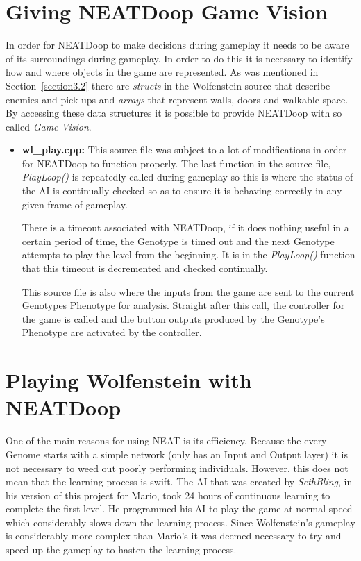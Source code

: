 \documentclass[]{Learning-to-Play-Wolfenstein-thesis}
\begin{document}
\section{Giving NEATDoop Game Vision}
In order for NEATDoop to make decisions during gameplay it needs to be aware of its surroundings during gameplay. In order to do this it is necessary to identify how and where objects in the game are represented. As was mentioned in Section~\ref{section3.2} there are \textit{structs} in the Wolfenstein source that describe enemies and pick-ups and \textit{arrays} that represent walls, doors and walkable space. By accessing these data structures it is possible to provide NEATDoop with so called \textit{Game Vision}.

\begin{itemize}
\item\textbf{wl\_play.cpp:} This source file was subject to a lot of modifications in order for NEATDoop to function properly. The last function in the source file, \textit{PlayLoop()} is repeatedly called during gameplay so this is where the status of the AI is continually checked so as to ensure it is behaving correctly in any given frame of gameplay. 

There is a timeout associated with NEATDoop, if it does nothing useful in a certain period of time, the Genotype is timed out and the next Genotype attempts to play the level from the beginning. It is in the \textit{PlayLoop()} function that this timeout is decremented and checked continually. 

This source file is also where the inputs from the game are sent to the current Genotypes Phenotype for analysis. Straight after this call, the controller for the game is called and the button outputs produced by the Genotype's Phenotype are activated by the controller.
\end{itemize}
\section{Playing Wolfenstein with NEATDoop}	%
One of the main reasons for using NEAT is its efficiency. Because the every Genome starts with a simple network (only has an Input and Output layer) it is not necessary to weed out poorly performing individuals. However, this does not mean that the learning process is swift. The AI that was created by \textit{SethBling}, in his version of this project for Mario, took 24 hours of continuous learning to complete the first level. He programmed his AI to play the game at normal speed which considerably slows down the learning process. Since Wolfenstein's gameplay is considerably more complex than Mario's it was deemed necessary to try and speed up the gameplay to hasten the learning process.
\end{document}

